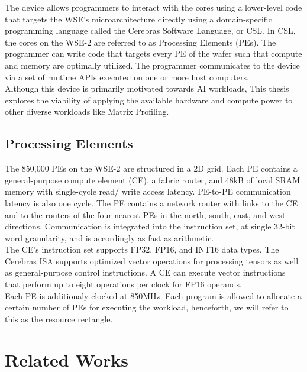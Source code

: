 The device allows programmers to interact with the cores using a lower-level code that targets the WSE's microarchitecture directly
using a domain-specific programming language called the Cerebras Software Language, or CSL. In CSL, the cores on the WSE-2 are referred to as Processing Elements (PEs). The programmer
can write code that targets every PE of the wafer such that compute and memory are optimally
utilized. The programmer communicates to the device via a set of runtime APIs executed on one
or more host computers.\\

Although this device is primarily motivated towards AI workloads, This thesis explores the viability of applying the available hardware and compute power to other diverse workloads like Matrix Profiling.\\


\subsection{Processing Elements}

The 850,000 PEs on the WSE-2 are structured in a 2D grid. Each PE contains a general-purpose compute element (CE), a fabric router, and 48kB of local SRAM memory with single-cycle read/
write access latency. PE-to-PE communication latency is also one cycle. The PE contains a network
router with links to the CE and to the routers of the four nearest PEs in the north, south, east,
and west directions. Communication is integrated into the instruction set, at single 32-bit word
granularity, and is accordingly as fast as arithmetic.\\

The CE's instruction set supports FP32, FP16, and INT16 data types. The Cerebras ISA supports
optimized vector operations for processing tensors as well as general-purpose control instructions.
A CE can execute vector instructions that perform up to eight operations per clock for FP16
operands.\\

Each PE is additionaly clocked at 850MHz. Each program is allowed to allocate a certain number of PEs for executing the workload, henceforth, we will refer to this as the resource rectangle. 

\section{Related Works}